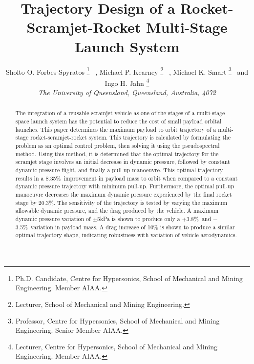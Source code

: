 \documentclass[journal]{new-aiaa}
\newcommand{\PayloadImprovement}{8.35\%}
\newcommand{\qDecrease}{20.3\%}
\newcommand{\qVariationPlus}{$+$3.8\%}
\newcommand{\qVariationMinus}{$-$3.5\%}
\providecommand{\DIFadd}[1]{{\protect\color{blue}\uwave{#1}}} %
\providecommand{\DIFdel}[1]{{\protect\color{red}\sout{#1}}}                      %
\providecommand{\DIFaddbegin}{} %
\providecommand{\DIFaddend}{} %
\providecommand{\DIFdelbegin}{} %
\providecommand{\DIFdelend}{} %
\newcommand{\DIFscaledelfig}{0.5}
\newlength{\DIFdelgraphicswidth} %
\newlength{\DIFdelgraphicsheight} %
\newcommand{\DIFaddincludegraphics}[2][]{{\color{blue}\fbox{\DIFOincludegraphics[#1]{#2}}}} %
\newcommand{\DIFdelincludegraphics}[2][]{%
\sbox{\DIFdelgraphicsbox}{\DIFOincludegraphics[#1]{#2}}%
\settoboxwidth{\DIFdelgraphicswidth}{\DIFdelgraphicsbox} %
\settoboxtotalheight{\DIFdelgraphicsheight}{\DIFdelgraphicsbox} %
\scalebox{\DIFscaledelfig}{%
\parbox[b]{\DIFdelgraphicswidth}{\usebox{\DIFdelgraphicsbox}\\[-\baselineskip] \rule{\DIFdelgraphicswidth}{0em}}\llap{\resizebox{\DIFdelgraphicswidth}{\DIFdelgraphicsheight}{%
\setlength{\unitlength}{\DIFdelgraphicswidth}%
\begin{picture}(1,1)%
\thicklines\linethickness{2pt} %
{\color[rgb]{1,0,0}\put(0,0){\framebox(1,1){}}}%
{\color[rgb]{1,0,0}\put(0,0){\line( 1,1){1}}}%
{\color[rgb]{1,0,0}\put(0,1){\line(1,-1){1}}}%
\end{picture}%
}\hspace*{3pt}}} %
} %
\DeclareRobustCommand{\DIFaddbegin}{\DIFOaddbegin \let\includegraphics\DIFaddincludegraphics} %
\DeclareRobustCommand{\DIFaddend}{\DIFOaddend \let\includegraphics\DIFOincludegraphics} %
\DeclareRobustCommand{\DIFdelbegin}{\DIFOdelbegin \let\includegraphics\DIFdelincludegraphics} %
\DeclareRobustCommand{\DIFdelend}{\DIFOaddend \let\includegraphics\DIFOincludegraphics} %
\begin{document}

\title{Trajectory Design of a Rocket-Scramjet-Rocket Multi-Stage Launch System} %




 \author{
 	Sholto O. Forbes-Spyratos%
 	\thanks{Ph.D. Candidate, Centre for Hypersonics, School of Mechanical and Mining Engineering. Member AIAA.}
 	\ ,  Michael P. Kearney
 	\thanks{Lecturer, School of Mechanical and Mining Engineering.}
 	\ ,  Michael K. Smart
 	\thanks{Professor, Centre for Hypersonics, School of Mechanical and Mining Engineering. Senior Member AIAA.}
 	\ and   Ingo H. Jahn
 	\thanks{Lecturer, Centre for Hypersonics, School of Mechanical and Mining Engineering. Member AIAA.}
 	\\
 	{\normalsize\itshape
 		The University of Queensland, Queensland, Australia, 4072}\\
 }



\maketitle

\begin{abstract}

The integration of a reusable scramjet vehicle as \DIFdelbegin \DIFdel{one of the stages of }\DIFdelend \DIFaddbegin \DIFadd{\textcolor{red}{the second} stage of }\DIFaddend a multi-stage space launch system has the potential to reduce the cost of small payload orbital launches. 
This paper determines the maximum payload to orbit trajectory of a multi-stage rocket-scramjet-rocket system. This trajectory is calculated by formulating the problem as an optimal control problem, then solving it using the pseudospectral method. 
Using this method, it is determined that the optimal trajectory for the scramjet stage involves an initial decrease in dynamic pressure, followed by constant dynamic pressure flight, and finally a pull-up manoeuvre. This optimal trajectory results in a \PayloadImprovement\ improvement in payload mass to orbit when compared to a constant dynamic pressure trajectory with minimum pull-up. 
Furthermore, the optimal pull-up manoeuvre decreases the maximum dynamic pressure experienced by the final rocket stage by \qDecrease. 
The sensitivity of the trajectory is tested by varying the maximum allowable dynamic pressure, and the drag produced by the vehicle. 
A maximum dynamic pressure variation of $\pm$5kPa is shown to produce only a \qVariationPlus\ and \qVariationMinus\ variation in payload mass. A drag increase of 10\% is shown to produce a similar optimal trajectory shape, indicating robustness with variation of vehicle aerodynamics. 


\end{abstract}
\end{document}
